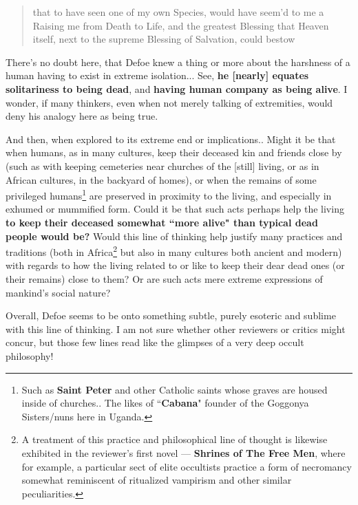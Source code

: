\documentclass[a4paper]{article}
\begin{document}
\noindent
\begin{minipage}{1\textwidth}
\vspace{1em}
\begin{quotation}
{\ttfamily

that to have seen one of my own Species, would have seem’d to me a Raising me from Death to Life, and the greatest Blessing that Heaven itself, next to the supreme Blessing of Salvation, could bestow


}
\end{quotation}
\vspace{1em}
\end{minipage}




There's no doubt here, that Defoe knew a thing or more about the harshness of a human having to exist in extreme isolation...  See, \textbf{he [nearly] equates solitariness to being dead}, and \textbf{having human company as being alive}. I wonder, if many thinkers, even when not merely talking of extremities, would deny his analogy here as being true. 

And then, when explored to its extreme end or implications.. Might it be that when humans, as in many cultures, keep their deceased kin and friends close by (such as with keeping cemeteries near churches of the [still] living, or as in African cultures, in the backyard of homes), or when the remains of some privileged humans\footnote{Such as \textbf{Saint Peter} and other Catholic saints whose graves are housed inside of churches.. The likes of ``\textbf{Cabana}" founder of the Goggonya Sisters/nuns here in Uganda.} are preserved in proximity to the living, and especially in exhumed or mummified form. Could it be that such acts perhaps help the living \textbf{to keep their deceased somewhat ``more alive" than typical dead people would be?} Would this line of thinking help justify many practices and traditions (both in Africa\footnote{A treatment of this practice and philosophical line of thought is likewise exhibited in the reviewer's first novel \cite{shrinesjwl} --- \textbf{Shrines of The Free Men}, where for example, a particular sect of elite occultists practice a form of necromancy somewhat reminiscent of ritualized vampirism and other similar peculiarities.} but also in many cultures both ancient and modern) with regards to how the living related to or like to keep their dear dead ones (or their remains) close to them? Or are such acts mere extreme expressions of mankind's social nature?


Overall, Defoe seems to be onto something subtle, purely esoteric and sublime with this line of thinking. I am not sure whether other reviewers or critics might concur, but those few lines read like the glimpses of a very deep occult philosophy!
\end{document}
